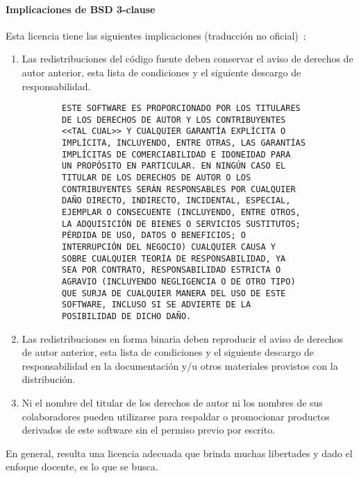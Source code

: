 \paragraph{Implicaciones de BSD 3-clause} Esta licencia tiene las siguientes implicaciones
(traducción no oficial)~\cite{bsd}:
\begin{enumerate}
    \item Las redistribuciones del código fuente deben conservar el aviso de
    derechos de autor anterior, esta lista de condiciones y el siguiente
    descargo de responsabilidad.
    \begin{verbatim}
        ESTE SOFTWARE ES PROPORCIONADO POR LOS TITULARES 
        DE LOS DERECHOS DE AUTOR Y LOS CONTRIBUYENTES 
        <<TAL CUAL>> Y CUALQUIER GARANTÍA EXPLÍCITA O
        IMPLÍCITA, INCLUYENDO, ENTRE OTRAS, LAS GARANTÍAS
        IMPLÍCITAS DE COMERCIABILIDAD E IDONEIDAD PARA 
        UN PROPÓSITO EN PARTICULAR. EN NINGÚN CASO EL 
        TITULAR DE LOS DERECHOS DE AUTOR O LOS 
        CONTRIBUYENTES SERÁN RESPONSABLES POR CUALQUIER 
        DAÑO DIRECTO, INDIRECTO, INCIDENTAL, ESPECIAL, 
        EJEMPLAR O CONSECUENTE (INCLUYENDO, ENTRE OTROS, 
        LA ADQUISICIÓN DE BIENES O SERVICIOS SUSTITUTOS;
        PÉRDIDA DE USO, DATOS O BENEFICIOS; O 
        INTERRUPCIÓN DEL NEGOCIO) CUALQUIER CAUSA Y 
        SOBRE CUALQUIER TEORÍA DE RESPONSABILIDAD, YA 
        SEA POR CONTRATO, RESPONSABILIDAD ESTRICTA O 
        AGRAVIO (INCLUYENDO NEGLIGENCIA O DE OTRO TIPO)
        QUE SURJA DE CUALQUIER MANERA DEL USO DE ESTE 
        SOFTWARE, INCLUSO SI SE ADVIERTE DE LA 
        POSIBILIDAD DE DICHO DAÑO.
    \end{verbatim}
    \item Las redistribuciones en forma binaria deben reproducir el aviso de
    derechos de autor anterior, esta lista de condiciones y el siguiente
    descargo de responsabilidad en la documentación y/u otros materiales
    provistos con la distribución.
    \item Ni el nombre del titular de los derechos de autor ni los nombres de
    sus colaboradores pueden utilizarse para respaldar o promocionar productos
    derivados de este software sin el permiso previo por escrito.
\end{enumerate}

En general, resulta una licencia adecuada que brinda muchas libertades y dado el
enfoque docente, es lo que se busca.